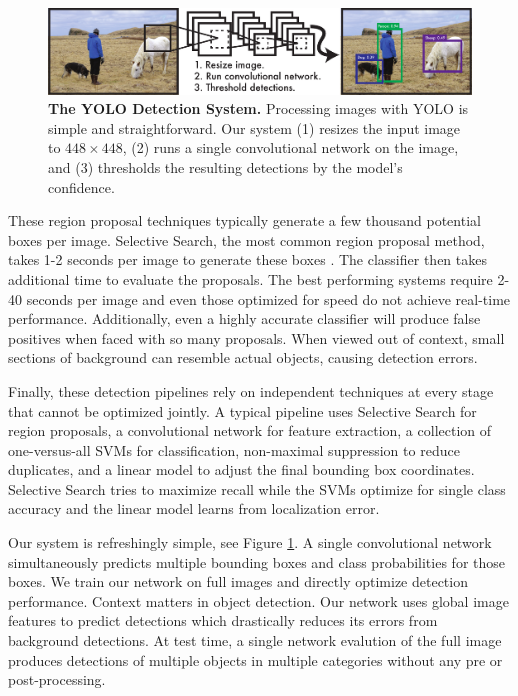 \documentclass{article} %
\begin{document}
\begin{figure}[t]
\begin{center}
        \includegraphics[width=\linewidth]{system2}
\end{center}
   \caption{\textbf{The YOLO Detection System.} Processing images with YOLO is simple and straightforward. Our system (1) resizes the input image to $448 \times 448$, (2) runs a single convolutional network on the image, and (3) thresholds the resulting detections by the model's confidence.}
\label{system}
\end{figure}

These region proposal techniques typically generate a few thousand potential boxes per image. Selective Search, the most common region proposal method, takes 1-2 seconds per image to generate these boxes \cite{uijlings2013selective}. The classifier then takes additional time to evaluate the proposals. The best performing systems require 2-40 seconds per image and even those optimized for speed do not achieve real-time performance. Additionally, even a highly accurate classifier will produce false positives when faced with so many proposals. When viewed out of context, small sections of background can resemble actual objects, causing detection errors.

Finally, these detection pipelines rely on independent techniques at every stage that cannot be optimized jointly. A typical pipeline uses Selective Search for region proposals, a convolutional network for feature extraction, a collection of one-versus-all SVMs for classification, non-maximal suppression to reduce duplicates, and a linear model to adjust the final bounding box coordinates. Selective Search tries to maximize recall while the SVMs optimize for single class accuracy and the linear model learns from localization error.

Our system is refreshingly simple, see Figure \ref{system}. A single convolutional network simultaneously predicts multiple bounding boxes and class probabilities for those boxes. We train our network on full images and directly optimize detection performance. Context matters in object detection. Our network uses global image features to predict detections which drastically reduces its errors from background detections. At test time, a single network evalution of the full image produces detections of multiple objects in multiple categories without any pre or post-processing.
\end{document}
